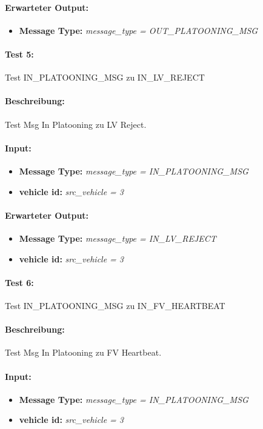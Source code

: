 \documentclass[a4paper, 12pt, titlepage]{scrartcl}
\begin{document}
{\begin{itemize}
			\end{itemize}
			\paragraph{Erwarteter Output:}
			\begin{itemize} \itemsep-0.5em
				\item \textbf{Message Type:} \emph{message\_type = OUT\_PLATOONING\_MSG}
			\end{itemize}

			\paragraph{Test 5:}{Test IN\_PLATOONING\_MSG zu IN\_LV\_REJECT}
			\paragraph{Beschreibung:} Test Msg In Platooning zu LV Reject.
			\paragraph{Input:}
			\begin{itemize} \itemsep-0.5em
				\item \textbf{Message Type:} \emph{message\_type = IN\_PLATOONING\_MSG}
				\item \textbf{vehicle id:} \emph{src\_vehicle = 3}
			\end{itemize}
			\paragraph{Erwarteter Output:}
			\begin{itemize} \itemsep-0.5em
				\item \textbf{Message Type:} \emph{message\_type = IN\_LV\_REJECT}
				\item \textbf{vehicle id:} \emph{src\_vehicle = 3}
			\end{itemize}

			\paragraph{Test 6:}{Test IN\_PLATOONING\_MSG zu IN\_FV\_HEARTBEAT}
			\paragraph{Beschreibung:} Test Msg In Platooning zu FV Heartbeat.
			\paragraph{Input:}
			\begin{itemize} \itemsep-0.5em
				\item \textbf{Message Type:} \emph{message\_type = IN\_PLATOONING\_MSG}
				\item \textbf{vehicle id:} \emph{src\_vehicle = 3}
			\end{itemize}
}
\end{document}
